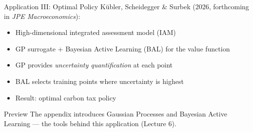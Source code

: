\documentclass[aspectratio=169,11pt]{beamer}
\newcommand{\emphc}[1]{\textcolor{harvardcrimson}{#1}}
\begin{document}
\begin{frame}{Application III: Optimal Policy}
K\"ubler, Scheidegger \& Surbek (2026, forthcoming in \emph{JPE Macroeconomics}):

\vspace{0.3cm}
\begin{itemize}
  \item High-dimensional integrated assessment model (IAM)
  \item \emphc{GP surrogate + Bayesian Active Learning (BAL)} for the value function
  \item GP provides \emph{uncertainty quantification} at each point
  \item BAL selects training points where uncertainty is highest
  \item Result: optimal carbon tax policy
\end{itemize}

\vspace{0.3cm}
\begin{alertblock}{Preview}
The appendix introduces \emphc{Gaussian Processes} and \emphc{Bayesian Active Learning} --- the tools behind this application (Lecture 6).
\end{alertblock}
\end{frame}
\end{document}
